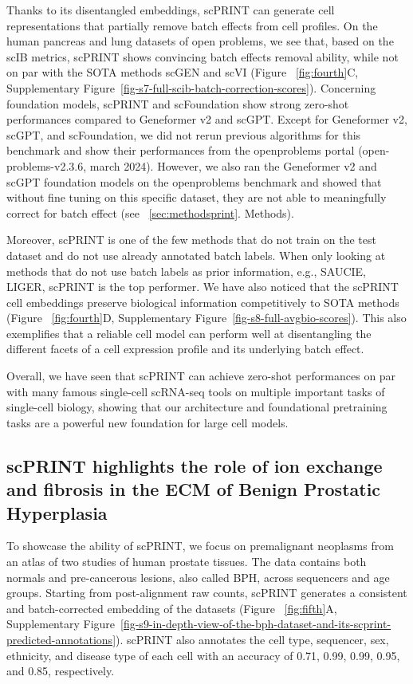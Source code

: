 Thanks to its disentangled embeddings, \gls{scPRINT} can generate cell representations that partially remove batch effects from cell profiles. On the human pancreas and lung datasets of open problems\citep{sikkemaIntegratedCellAtlas2023}, we see that, based on the \gls{scIB} metrics, \gls{scPRINT} shows convincing batch effects removal ability, while not on par with the \gls{SOTA} methods \gls{scGEN} and \gls{scVI} (Figure ~\ref{fig:fourth}C, Supplementary Figure~\ref{fig-s7-full-scib-batch-correction-scores}). Concerning foundation models, \gls{scPRINT} and scFoundation show strong zero-shot performances compared to Geneformer v2 and \gls{scGPT}. Except for Geneformer v2, \gls{scGPT}, and scFoundation, we did not rerun previous algorithms for this benchmark and show their performances from the openproblems portal (open-problems-v2.3.6, march 2024). However, we also ran the Geneformer v2 and \gls{scGPT} foundation models on the openproblems benchmark and showed that without fine tuning on this specific dataset, they are not able to meaningfully correct for batch effect (see ~\ref{sec:methodsprint}. Methods).

Moreover, \gls{scPRINT} is one of the few methods that do not train on the test dataset and do not use already annotated batch labels. When only looking at methods that do not use batch labels as prior information, e.g., SAUCIE\citep{amodioExploringSinglecellData2019}, LIGER\citep{liuJointlyDefiningCell2020}, \gls{scPRINT} is the top performer. We have also noticed that the \gls{scPRINT} cell embeddings preserve biological information competitively to \gls{SOTA} methods (Figure ~\ref{fig:fourth}D, Supplementary Figure~\ref{fig-s8-full-avgbio-scores}). This also exemplifies that a reliable cell model can perform well at disentangling the different facets of a cell expression profile and its underlying batch effect.

Overall, we have seen that \gls{scPRINT} can achieve zero-shot performances on par with many famous single-cell \gls{scRNA-seq} tools on multiple important tasks of single-cell biology, showing that our architecture and foundational pretraining tasks are a powerful new foundation for large cell models.

\subsection{scPRINT highlights the role of ion exchange and fibrosis in the ECM of Benign Prostatic Hyperplasia}

To showcase the ability of \gls{scPRINT}, we focus on premalignant neoplasms from an atlas of two studies of human prostate tissues\citep{josephSingleCellAnalysis2021}. The data contains both normals and pre-cancerous lesions, also called \gls{BPH}, across sequencers and age groups. Starting from post-alignment raw counts, \gls{scPRINT} generates a consistent and batch-corrected embedding of the datasets (Figure ~\ref{fig:fifth}A, Supplementary Figure~\ref{fig-s9-in-depth-view-of-the-bph-dataset-and-its-scprint-predicted-annotations}). \gls{scPRINT} also annotates the cell type, sequencer, sex, ethnicity, and disease type of each cell with an accuracy of 0.71, 0.99, 0.99, 0.95, and 0.85, respectively.

